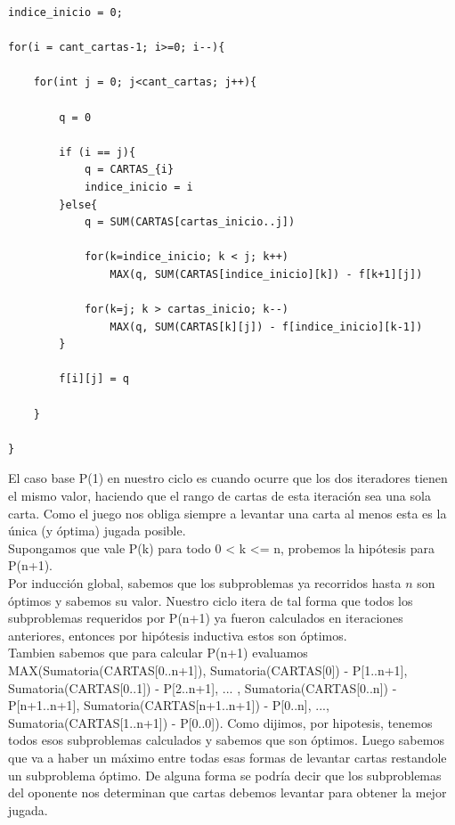 \begin{lstlisting}
indice_inicio = 0;

for(i = cant_cartas-1; i>=0; i--){

	for(int j = 0; j<cant_cartas; j++){
		
		q = 0
		
		if (i == j){
			q = CARTAS_{i}
			indice_inicio = i
		}else{
			q = SUM(CARTAS[cartas_inicio..j])
			
			for(k=indice_inicio; k < j; k++)
				MAX(q, SUM(CARTAS[indice_inicio][k]) - f[k+1][j])
			
			for(k=j; k > cartas_inicio; k--)
				MAX(q, SUM(CARTAS[k][j]) - f[indice_inicio][k-1])
		}		
		
		f[i][j] = q
		
	}

}
\end{lstlisting}

El caso base P(1) en nuestro ciclo es cuando ocurre que los dos iteradores tienen el mismo valor, haciendo que el rango de cartas de esta iteraci\'on sea una sola carta. Como el juego nos obliga siempre a levantar una carta al menos esta es la \'unica (y \'optima) jugada posible. \\

Supongamos que vale P(k) para todo 0 < k <= n, probemos la hip\'otesis para P(n+1). \\

Por inducci\'on global, sabemos que los subproblemas ya recorridos hasta $n$ son \'optimos y sabemos su valor. Nuestro ciclo itera de tal forma que todos los subproblemas requeridos por P(n+1) ya fueron calculados en iteraciones anteriores, entonces por hip\'otesis inductiva estos son \'optimos. \\

Tambien sabemos que para calcular P(n+1) evaluamos MAX(Sumatoria(CARTAS[0..n+1]), Sumatoria(CARTAS[0]) - P[1..n+1], Sumatoria(CARTAS[0..1]) - P[2..n+1], ... , Sumatoria(CARTAS[0..n]) - P[n+1..n+1], Sumatoria(CARTAS[n+1..n+1]) - P[0..n], ..., Sumatoria(CARTAS[1..n+1]) - P[0..0]). Como dijimos, por hipotesis, tenemos todos esos subproblemas calculados y sabemos que son \'optimos. Luego sabemos que va a haber un m\'aximo entre todas esas formas de levantar cartas restandole un subproblema \'optimo. De alguna forma se podr\'ia decir que los subproblemas del oponente nos determinan que cartas debemos levantar para obtener la mejor jugada.


